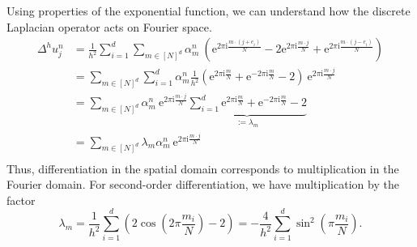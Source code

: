 \documentclass[12pt, reqno]{report}
\theoremstyle{definition}
\theoremstyle{remark}
\newcommand{\e}{\mathrm{e}}
\renewcommand{\i}{\mathrm{i}}
\begin{document}
Using properties of the exponential function, we can understand how the discrete Laplacian operator acts on Fourier space.
\begin{align*}
		\Delta^{h}u_{j}^{n}&=\frac{1}{h^2}\sum_{i=1}^{d} \sum_{m\in[N]^{d}}\alpha_{m}^{n}~\left(\e^{2\pi \i \frac{m\cdot(j + e_{i})}{N}}-2\e^{2\pi\i\frac{m\cdot j}{N}}+\e^{2\pi\i\frac{m\cdot(j-e_{i})}{N}}\right)\\
		&=\sum_{m\in[N]^{d}}\sum_{i=1}^{d}\alpha_m^n\frac{1}{h^2}\left( \e^{2\pi\i\frac{m}{N}}+\e^{-2\pi\i\frac{m}{N}}-2 \right)~\e^{2\pi\i\frac{m\cdot j}{N}}\\
		&= \sum_{m\in[N]^{d}}\alpha_{m}^{n}~\e^{2\pi\i \frac{m\cdot j}{N}}\underbrace{\sum_{i=1}^{d}\e^{2\pi\i \frac{m}{N}}+\e^{-2\pi\i \frac{m}{N}}-2}_{:=\lambda_{m}} \\
		&=\sum_{m\in[N]^{d}}\lambda_m\alpha_m^n~\e^{2\pi\i\frac{m\cdot j}{N}}\\
\end{align*}
Thus, differentiation in the spatial domain corresponds to multiplication in the Fourier domain. For second-order differentiation, we have multiplication by the factor
\begin{equation}
    \lambda_{m}= \frac{1}{h^{2}}\sum_{i=1}^{d}\left(2\cos\left(2\pi \frac{m_{i}}{N}\right)-2\right)=- \frac{4}{h^{2}}\sum_{i=1}^{d}\sin^{2}\left(\pi \frac{m_{i}}{N}\right).
\end{equation}
\end{document}
